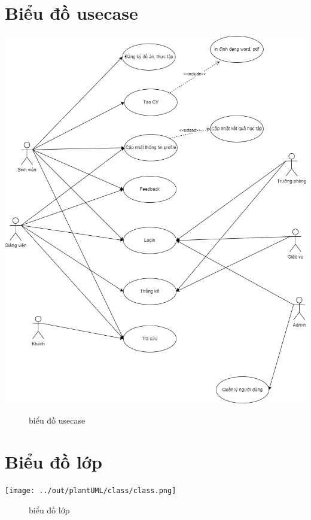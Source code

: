 \section{Biểu đồ usecase}
\begin{center}
	\includegraphics[width=1.\textwidth]{../drawio/usecase.png}
	\begin{figure}[h]
		\centering
		\caption{biểu đồ usecase}
	\end{figure}
\end{center}

\section{Biểu đồ lớp}
\begin{center}
	\texttt{[image: ../out/plantUML/class/class.png]}
	\begin{figure}[h]
		\centering
		\caption{biểu đồ lớp}
	\end{figure}
\end{center}




% 


